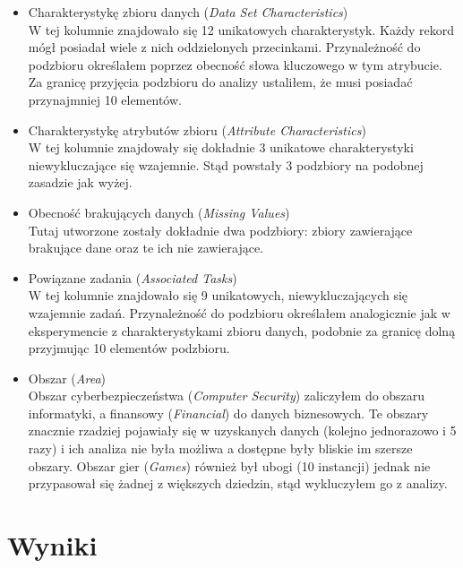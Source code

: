 \begin{itemize}
  \item Charakterystykę zbioru danych (\emph{Data Set Characteristics}) \\
        W tej kolumnie znajdowało się 12 unikatowych charakterystyk.
        Każdy rekord mógł posiadał wiele z nich oddzielonych przecinkami.
        Przynależność do podzbioru określałem poprzez obecność słowa kluczowego w tym atrybucie.
        Za granicę przyjęcia podzbioru do analizy ustaliłem, że musi posiadać przynajmniej 10 elementów.

  \item Charakterystykę atrybutów zbioru (\emph{Attribute Characteristics}) \\
        W tej kolumnie znajdowały się dokładnie 3 unikatowe charakterystyki niewykluczające się wzajemnie.
        Stąd powstały 3 podzbiory na podobnej zasadzie jak wyżej.

  \item Obecność brakujących danych (\emph{Missing Values}) \\
        Tutaj utworzone zostały dokładnie dwa podzbiory: zbiory zawierające brakujące dane oraz te ich nie zawierające.

  \item Powiązane zadania (\emph{Associated Tasks}) \\
        W tej kolumnie znajdowało się 9 unikatowych, niewykluczających się wzajemnie zadań.
        Przynależność do podzbioru określałem analogicznie jak w eksperymencie z charakterystykami zbioru danych, podobnie za granicę dolną przyjmując 10 elementów podzbioru.

  \item Obszar (\emph{Area}) \\
        Obszar cyberbezpieczeństwa (\emph{Computer Security}) zaliczyłem do obszaru informatyki, a finansowy (\emph{Financial}) do danych biznesowych.
        Te obszary znacznie rzadziej pojawiały się w uzyskanych danych (kolejno jednorazowo i 5 razy) i ich analiza nie była możliwa a dostępne były bliskie im szersze obszary.
        Obszar gier (\emph{Games}) również był ubogi (10 instancji) jednak nie przypasował się żadnej z większych dziedzin, stąd wykluczyłem go z analizy.

\end{itemize}


\section{Wyniki}

